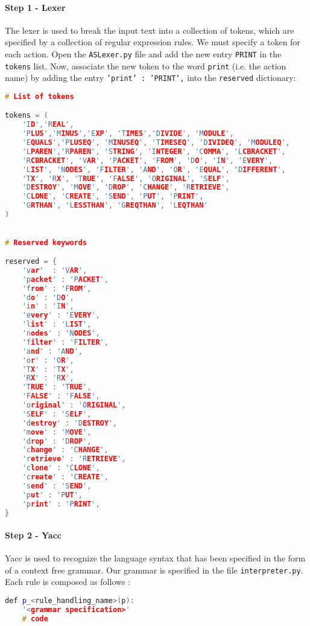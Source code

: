 \paragraph{Step 1 - Lexer}
The lexer is used to break the input text into a collection of tokens, which are specified by a collection of regular expression rules. We must specify a token for each action.
Open the \texttt{ASLexer.py} file and add the new entry \texttt{PRINT} in the \texttt{tokens} list. Now, associate the new token to the word \texttt{print} (i.e. the action name) by adding the entry \texttt{'print' : 'PRINT',} into the \texttt{reserved} dictionary:
%
\begin{lstlisting}[language={cpp}]
# List of tokens

tokens = (
	'ID','REAL',
	'PLUS','MINUS','EXP', 'TIMES','DIVIDE', 'MODULE',
	'EQUALS','PLUSEQ', 'MINUSEQ', 'TIMESEQ', 'DIVIDEQ', 'MODULEQ',
	'LPAREN','RPAREN', 'STRING', 'INTEGER', 'COMMA', 'LCBRACKET',
	'RCBRACKET', 'VAR', 'PACKET', 'FROM', 'DO', 'IN', 'EVERY',
	'LIST', 'NODES', 'FILTER', 'AND', 'OR', 'EQUAL', 'DIFFERENT',
	'TX', 'RX', 'TRUE', 'FALSE', 'ORIGINAL', 'SELF',
	'DESTROY', 'MOVE', 'DROP', 'CHANGE', 'RETRIEVE',
	'CLONE', 'CREATE', 'SEND', 'PUT', 'PRINT',
	'GRTHAN', 'LESSTHAN', 'GREQTHAN', 'LEQTHAN' 
)
 

# Reserved keywords

reserved = {
	'var'  : 'VAR',
	'packet' : 'PACKET',
	'from' : 'FROM',
	'do' : 'DO',
	'in' : 'IN',
	'every' : 'EVERY',
	'list' : 'LIST',
	'nodes' : 'NODES',
	'filter' : 'FILTER',
	'and' : 'AND',
	'or' : 'OR',
	'TX' : 'TX',
	'RX' : 'RX',
	'TRUE' : 'TRUE',
	'FALSE' : 'FALSE',
	'original' : 'ORIGINAL',
	'SELF' : 'SELF',
	'destroy' : 'DESTROY',
	'move' : 'MOVE',
	'drop' : 'DROP',
	'change' : 'CHANGE',
	'retrieve' : 'RETRIEVE',
	'clone' : 'CLONE',
	'create' : 'CREATE',
	'send' : 'SEND',
	'put' : 'PUT',
	'print' : 'PRINT',
}
\end{lstlisting}

\paragraph{Step 2 - Yacc}
Yacc is used to recognize the language syntax that has been specified in the form of a context free grammar. Our grammar is specified in the file \texttt{interpreter.py}. Each rule is composed as follows :
%
\begin{lstlisting}[language={cpp}]
def p_<rule_handling_name>(p):
	'<grammar specification>'
	# code
\end{lstlisting} 

